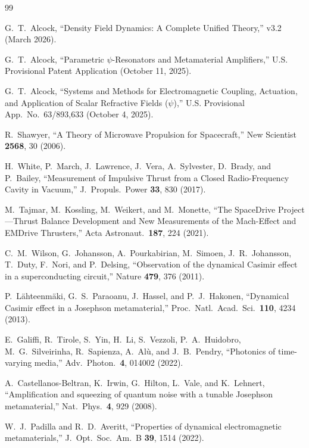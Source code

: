 \documentclass[12pt,aps,prd,twocolumn,superscriptaddress,nofootinbib]{revtex4-2}
\begin{document}
\begin{thebibliography}{99}

G.~T.~Alcock,
``Density Field Dynamics: A Complete Unified Theory,''
v3.2 (March 2026).

G.~T.~Alcock,
``Parametric $\psi$-Resonators and Metamaterial Amplifiers,''
U.S. Provisional Patent Application (October 11, 2025).

G.~T.~Alcock,
``Systems and Methods for Electromagnetic Coupling, Actuation, and
Application of Scalar Refractive Fields ($\psi$),''
U.S. Provisional App.\ No.\ 63/893,633 (October 4, 2025).

R.~Shawyer,
``A Theory of Microwave Propulsion for Spacecraft,''
New Scientist \textbf{2568}, 30 (2006).

H.~White, P.~March, J.~Lawrence, J.~Vera, A.~Sylvester, D.~Brady,
and P.~Bailey,
``Measurement of Impulsive Thrust from a Closed Radio-Frequency Cavity
in Vacuum,''
J.\ Propuls.\ Power \textbf{33}, 830 (2017).

M.~Tajmar, M.~Kossling, M.~Weikert, and M.~Monette,
``The SpaceDrive Project---Thrust Balance Development and New
Measurements of the Mach-Effect and EMDrive Thrusters,''
Acta Astronaut.\ \textbf{187}, 224 (2021).

C.~M.~Wilson, G.~Johansson, A.~Pourkabirian, M.~Simoen,
J.~R.~Johansson, T.~Duty, F.~Nori, and P.~Delsing,
``Observation of the dynamical Casimir effect in a superconducting
circuit,''
Nature \textbf{479}, 376 (2011).

P.~L\"ahteenm\"aki, G.~S.~Paraoanu, J.~Hassel, and P.~J.~Hakonen,
``Dynamical Casimir effect in a Josephson metamaterial,''
Proc.\ Natl.\ Acad.\ Sci.\ \textbf{110}, 4234 (2013).

E.~Galiffi, R.~Tirole, S.~Yin, H.~Li, S.~Vezzoli, P.~A.~Huidobro,
M.~G.~Silveirinha, R.~Sapienza, A.~Al\`u, and J.~B.~Pendry,
``Photonics of time-varying media,''
Adv.\ Photon.\ \textbf{4}, 014002 (2022).

A.~Castellanos-Beltran, K.~Irwin, G.~Hilton, L.~Vale,
and K.~Lehnert,
``Amplification and squeezing of quantum noise with a tunable
Josephson metamaterial,''
Nat.\ Phys.\ \textbf{4}, 929 (2008).

W.~J.~Padilla and R.~D.~Averitt,
``Properties of dynamical electromagnetic metamaterials,''
J.\ Opt.\ Soc.\ Am.\ B \textbf{39}, 1514 (2022).


\end{thebibliography}
\end{document}
